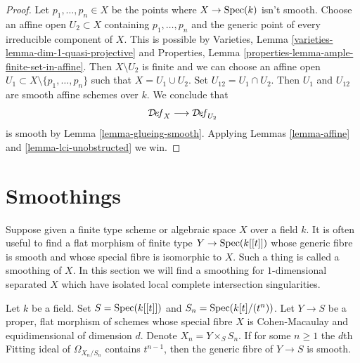 \begin{proof}
Let $p_1, \ldots, p_n \in X$ be the points where $X \to \mathop{\mathrm{Spec}}(k)$
isn't smooth. Choose an affine open $U_2 \subset X$ containing
$p_1, \ldots, p_n$ and the generic point of every irreducible
component of $X$. This is possible by
Varieties, Lemma \ref{varieties-lemma-dim-1-quasi-projective}
and Properties, Lemma \ref{properties-lemma-ample-finite-set-in-affine}.
Then $X \setminus U_2$ is finite and we can choose an affine open
$U_1 \subset X \setminus \{p_1, \ldots, p_n\}$ such that
$X = U_1 \cup U_2$. Set $U_{12} = U_1 \cap U_2$.
Then $U_1$ and $U_{12}$ are smooth affine schemes over $k$.
We conclude that
$$
\mathcal{D}\!\mathit{ef}_X \longrightarrow \mathcal{D}\!\mathit{ef}_{U_2}
$$
is smooth by Lemma \ref{lemma-glueing-smooth}.
Applying Lemmas \ref{lemma-affine} and \ref{lemma-lci-unobstructed} we win.
\end{proof}




\section{Smoothings}
\label{section-smoothing}

\noindent
Suppose given a finite type scheme or algebraic space $X$ over a field $k$.
It is often useful to find a flat morphism of finite type $Y \to \mathop{\mathrm{Spec}}(k[[t]])$
whose generic fibre is smooth and whose special fibre is isomorphic to $X$.
Such a thing is called a smoothing of $X$. In this section we will find
a smoothing for $1$-dimensional separated $X$ which have isolated
local complete intersection singularities.

\begin{lemma}
\label{lemma-criterion-smoothing}
Let $k$ be a field. Set $S = \mathop{\mathrm{Spec}}(k[[t]])$ and
$S_n = \mathop{\mathrm{Spec}}(k[t]/(t^n))$. Let $Y \to S$ be a proper, flat morphism
of schemes whose special fibre $X$ is Cohen-Macaulay and
equidimensional of dimension $d$. Denote $X_n = Y \times_S S_n$.
If for some $n \geq 1$ the $d$th Fitting ideal of $\Omega_{X_n/S_n}$
contains $t^{n - 1}$, then the generic fibre of $Y \to S$ is smooth.
\end{lemma}

